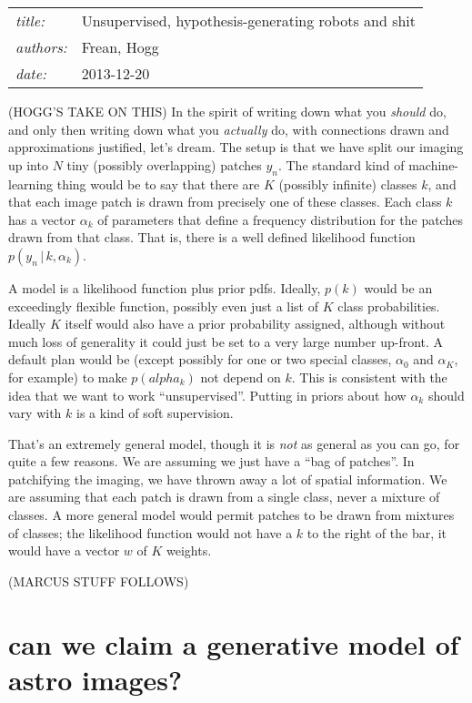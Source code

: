\documentclass[12pt]{article}
\newcommand{\given}{\,|\,}
\begin{document}
\sloppy\sloppypar

\noindent
\begin{tabular}{ll}
\textsl{title:} & Unsupervised, hypothesis-generating robots and shit \\
\textsl{authors:} & Frean, Hogg \\
\textsl{date:}    & 2013-12-20
\end{tabular}
\bigskip

(HOGG'S TAKE ON THIS)
In the spirit of writing down what you \emph{should} do,
  and only then writing down what you \emph{actually} do,
  with connections drawn and approximations justified,
  let's dream.
The setup is that we have split our imaging up into $N$ tiny
  (possibly overlapping) patches $y_n$.
The standard kind of machine-learning thing would be to
  say that there are $K$ (possibly infinite) classes $k$,
  and that each image patch is drawn from precisely one of these classes.
Each class $k$ has a vector $\alpha_k$ of parameters
  that define a frequency distribution
  for the patches drawn from that class.
That is, there is a well defined likelihood function $p(y_n\given k, \alpha_k)$.

A model is a likelihood function plus prior pdfs.
Ideally, $p(k)$ would be an exceedingly flexible function,
  possibly even just a list of $K$ class probabilities.
Ideally $K$ itself would also have a prior probability assigned,
  although without much loss of generality
  it could just be set to a very large number up-front.
A default plan would be 
  (except possibly for one or two special classes,
   $\alpha_0$ and $\alpha_K$, for example)
  to make $p(alpha_k)$ not depend on $k$.
This is consistent with the idea that we want to work ``unsupervised''.
Putting in priors about how $\alpha_k$ should vary with $k$ is a kind of soft supervision.

That's an extremely general model,
  though it is \emph{not} as general as you can go,
  for quite a few reasons.
We are assuming we just have a ``bag of patches''.
In patchifying the imaging, we have thrown away a lot of spatial information.
We are assuming that each patch is drawn from a single class,
  never a mixture of classes.
A more general model would permit patches to be drawn from mixtures of classes;
  the likelihood function would not have a $k$ to the right of the bar,
  it would have a vector $w$ of $K$ weights.

(MARCUS STUFF FOLLOWS)
\section{can we claim a generative model of astro images?}
\end{document}
